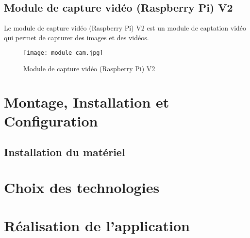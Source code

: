         \vspace{1cm}

        \subsection{Module de capture vidéo (Raspberry Pi) V2}
        Le module de capture vidéo (Raspberry Pi) V2 est un module de captation vidéo qui permet de capturer des images et des vidéos.
        \begin{figure}[h]
            \centering        
            \texttt{[image: module\_cam.jpg]}
            \caption{Module de capture vidéo (Raspberry Pi) V2}
        \end{figure}
        
    \section{Montage, Installation et Configuration}
        \subsection{Installation du matériel}  
        
    
    \section{Choix des technologies}
    \section{Réalisation de l'application}
        
        